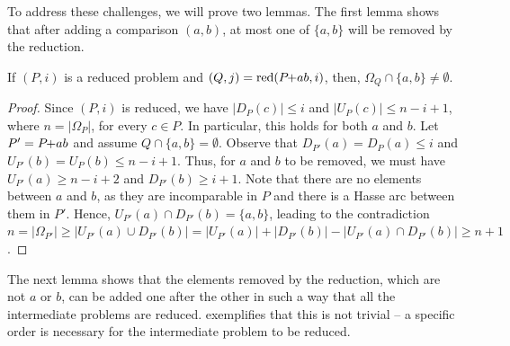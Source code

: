 \documentclass[a4paper,UKenglish,cleveref, autoref, thm-restate, anonymous]{lipics-v2021}
\newcommand{\pchild}[3]{{#1}\kern-1pt{+}{#2}{#3}}
\newcommand{\reduced}[1]{\operatorname{red}#1}
\newcommand{\less}[2]{D_{#1}(#2)}
\newcommand{\greater}[2]{U_{#1}(#2)}
\begin{document}
To address these challenges, we will prove two lemmas.
The first lemma shows that after adding a comparison $(a, b)$, at most one of $\{a, b\}$ will be removed by the reduction.

\begin{lemma} \label{lemma:remove_only_last_element_edge}
  If $(P, i)$ is a reduced problem and $(Q, j) = \reduced{(\pchild{P}{a}{b}, i)}$, then, $\Omega_Q \cap \{a, b\} \neq \emptyset$.
\end{lemma}

\begin{proof}
  Since $(P, i)$ is reduced, we have $|\less{P}{c}| \leq i$ and $|\greater{P}{c}| \leq n - i + 1$, where $n = |\Omega_P|$, for every $c \in P$.
  In particular, this holds for both $a$ and $b$.
  Let $P' = \pchild{P}{a}{b}$ and assume $Q \cap \{a, b\} = \emptyset$.
  Observe that $\less{P'}{a} = \less{P}{a} \leq i$ and $\greater{P'}{b} = \greater{P}{b} \leq n - i + 1$.
  Thus, for $a$ and $b$ to be removed, we must have $\greater{P'}{a} \geq n - i + 2$ and $\less{P'}{b} \geq i + 1$.
  Note that there are no elements between $a$ and $b$, as they are incomparable in $P$ and there is a Hasse arc between them in $P'$.
  Hence, $\greater{P'}{a} \cap \less{P'}{b} = \{a, b\}$, leading to the contradiction $n = |\Omega_{P'}| \ge |\greater{P'}{a} \cup \less{P'}{b}| = |\greater{P'}{a}| + |\less{P'}{b}| - |\greater{P'}{a} \cap \less{P'}{b}| \ge n + 1$.
\end{proof}

The next lemma shows that the elements removed by the reduction, which are not $a$ or $b$, can be added one after the other in such a way that all the intermediate problems are reduced.
 exemplifies that this is not trivial -- a specific order is necessary for the intermediate problem to be reduced.
\end{document}
